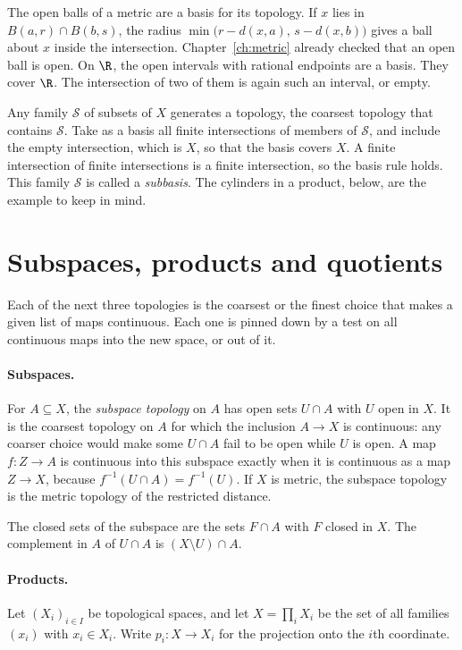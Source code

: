 The open balls of a metric are a basis for its topology. If $x$ lies in $B(a,r)\cap B(b,s)$, the radius $\min\bigl(r-d(x,a),\,s-d(x,b)\bigr)$ gives a ball about $x$ inside the intersection. Chapter~\ref{ch:metric} already checked that an open ball is open. On $\R$, the open intervals with rational endpoints are a basis. They cover $\R$. The intersection of two of them is again such an interval, or empty.

Any family $\mathcal S$ of subsets of $X$ generates a topology, the coarsest topology that contains $\mathcal S$. Take as a basis all finite intersections of members of $\mathcal S$, and include the empty intersection, which is $X$, so that the basis covers $X$. A finite intersection of finite intersections is a finite intersection, so the basis rule holds. This family $\mathcal S$ is called a \emph{subbasis}. The cylinders in a product, below, are the example to keep in mind.

\section{Subspaces, products and quotients}

Each of the next three topologies is the coarsest or the finest choice that makes a given list of maps continuous. Each one is pinned down by a test on all continuous maps into the new space, or out of it.

\paragraph{Subspaces.}
For $A\subseteq X$, the \emph{subspace topology} on $A$ has open sets $U\cap A$ with $U$ open in $X$. It is the coarsest topology on $A$ for which the inclusion $A\to X$ is continuous: any coarser choice would make some $U\cap A$ fail to be open while $U$ is open. A map $f:Z\to A$ is continuous into this subspace exactly when it is continuous as a map $Z\to X$, because $f^{-1}(U\cap A)=f^{-1}(U)$. If $X$ is metric, the subspace topology is the metric topology of the restricted distance.

The closed sets of the subspace are the sets $F\cap A$ with $F$ closed in $X$. The complement in $A$ of $U\cap A$ is $(X\setminus U)\cap A$.

\paragraph{Products.}
Let $(X_i)_{i\in I}$ be topological spaces, and let $X=\prod_i X_i$ be the set of all families $(x_i)$ with $x_i\in X_i$. Write $p_i:X\to X_i$ for the projection onto the $i$th coordinate.

